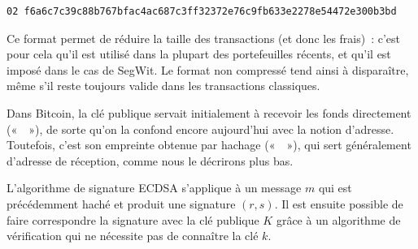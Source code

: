 \begin{Verbatim}[fontsize=\scriptsize]
02 f6a6c7c39c88b767bfac4ac687c3ff32372e76c9fb633e2278e54472e300b3bd
\end{Verbatim}

Ce format permet de réduire la taille des transactions (et donc les frais)~: c'est pour cela qu'il est utilisé dans la plupart des portefeuilles récents, et qu'il est imposé dans le cas de SegWit. Le format non compressé tend ainsi à disparaître, même s'il reste toujours valide dans les transactions classiques.

Dans Bitcoin, la clé publique servait initialement à recevoir les fonds directement («~~»), de sorte qu'on la confond encore aujourd'hui avec la notion d'adresse. Toutefois, c'est son empreinte obtenue par hachage («~~»), qui sert généralement d'adresse de réception, comme nous le décrirons plus bas.


L'algorithme de signature ECDSA s'applique à un message $m$ qui est précédemment haché et produit une signature $(r, s)$. Il est ensuite possible de faire correspondre la signature avec la clé publique $K$ grâce à un algorithme de vérification qui ne nécessite pas de connaître la clé $k$.

